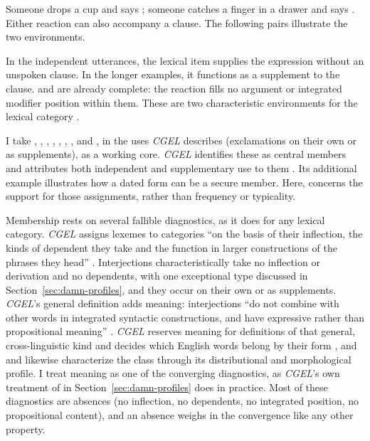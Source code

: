 \documentclass[12pt]{article}
\newcommand{\exmention}[1]{\mention{#1}}
\begin{document}
Someone drops a cup and says ; someone catches a finger
in a drawer and says . Either reaction can also accompany
a clause. The following pairs illustrate the two environments.

\ea\label{ex:core-distribution}
  \ea \exmention{Oops!}\qquad\exmention{Oops, I've dropped it!}
  \ex \exmention{Ouch!}\qquad\exmention{Ouch, that hurt!}
  \z
\z

In the independent utterances, the lexical item supplies the expression
without an unspoken clause. In the longer examples, it functions as
a supplement to the clause.  and  are already complete: the reaction fills no argument or integrated
modifier position within them. These are two characteristic environments
for the lexical category .

I take , , , ,
, , , and , in the uses
\textit{CGEL} describes (exclamations on their own or as supplements), as a
working core. \textit{CGEL}
identifies these as central members and attributes both independent and
supplementary use to them \citep[1361]{HuddlestonPullum2002}. Its
additional example  illustrates how a dated form can be a
secure member. Here,  concerns the support for those
assignments, rather than frequency or typicality.

Membership rests on several fallible diagnostics, as it does for any
lexical category. \textit{CGEL} assigns lexemes to categories \enquote{on
the basis of their inflection, the kinds of dependent they take and the
function in larger constructions of the phrases they head}
\citep[30]{HuddlestonPullum2002}. Interjections characteristically take no
inflection or derivation \citep[106]{ameka1992} and no dependents, with one
exceptional type discussed in Section~\ref{sec:damn-profiles}, and they
occur on their own or as supplements. \textit{CGEL}'s general definition adds meaning:
interjections \enquote{do not combine with other words in integrated
syntactic constructions, and have expressive rather than propositional
meaning} \citep[1361]{HuddlestonPullum2002}. \textit{CGEL} reserves meaning
for definitions of that general, cross-linguistic kind and decides which
English words belong by their form \citep[31--32]{HuddlestonPullum2002},
and \textcite[105--106]{ameka1992} and \textcite[124--125]{wilkins1992}
likewise characterize the class through its distributional and
morphological profile. I treat meaning as one of the converging diagnostics,
as \textit{CGEL}'s own treatment of  in
Section~\ref{sec:damn-profiles} does in practice. Most of these diagnostics
are absences (no inflection, no dependents, no integrated position, no
propositional content), and an absence weighs in the convergence like any
other property.
\end{document}
